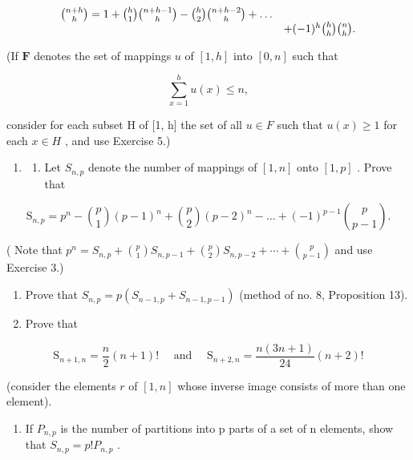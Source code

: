 \[
\begin{array}{r l} \binom {n + h} {h} = 1 + \binom {h} {1} \binom {n + h - 1} {h} - \binom {h} {2} \binom {n + h - 2} {h} + \dots \\ & + (- 1) ^ {h} \binom {h} {h} \binom {n} {h}. \end{array}
\]

(If \(\mathbf{F}\) denotes the set of mappings \(u\) of \([1, h]\) into \([0, n]\) such that

\[
\sum_ {x = 1} ^ {h} u (x) \leqslant n,
\]

consider for each subset H of {[}1, h{]} the set of all \(u \in F\) such that \(u(x) \geqslant 1\) for each \(x \in H\) , and use Exercise 5.)

\begin{enumerate}
\def\labelenumi{\arabic{enumi}.}
\setcounter{enumi}{6}
\tightlist
\item
  \begin{enumerate}
  \def\labelenumii{(\alph{enumii})}
  \tightlist
  \item
    Let \(S_{n,p}\) denote the number of mappings of \([1, n]\) onto \([1, p]\) . Prove that
  \end{enumerate}
\end{enumerate}

\[
\mathrm{S} _ {n, p} = p ^ {n} - \binom {p} {1} (p - 1) ^ {n} + \binom {p} {2} (p - 2) ^ {n} - \dots + (- 1) ^ {p - 1} \binom {p} {p - 1}.
\]

( Note that \(p^{n} = S_{n,p} + \binom{p}{1} S_{n,p-1} + \binom{p}{2} S_{n,p-2} + \cdots + \binom{p}{p-1}\) and use Exercise 3.)

\begin{enumerate}
\def\labelenumi{(\alph{enumi})}
\setcounter{enumi}{1}
\item
  Prove that \(S_{n,p} = p(S_{n-1,p} + S_{n-1,p-1})\) (method of no. 8, Proposition 13).
\item
  Prove that
\end{enumerate}

\[
\mathrm{S} _ {n + 1, n} = \frac {n}{2} (n + 1)! \quad \text { and } \quad \mathrm{S} _ {n + 2, n} = \frac {n (3 n + 1)}{2 4} (n + 2)!
\]

(consider the elements \(r\) of \([1, n]\) whose inverse image consists of more than one element).

\begin{enumerate}
\def\labelenumi{(\alph{enumi})}
\setcounter{enumi}{3}
\tightlist
\item
  If \(P_{n,p}\) is the number of partitions into p parts of a set of n elements, show that \(S_{n,p} = p!P_{n,p}\) .
\end{enumerate}

